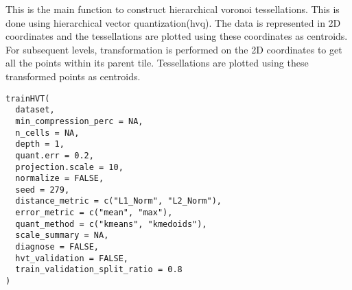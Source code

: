 \documentclass[letterpaper]{book}
\begin{document}
%
\begin{Description}
This is the main function to construct hierarchical voronoi tessellations.
This is done using hierarchical vector quantization(hvq). The data is represented in 2D
coordinates and the tessellations are plotted using these coordinates as
centroids. For subsequent levels, transformation is performed on the 2D
coordinates to get all the points within its parent tile. Tessellations are
plotted using these transformed points as centroids.
\end{Description}
%
\begin{Usage}
\begin{verbatim}
trainHVT(
  dataset,
  min_compression_perc = NA,
  n_cells = NA,
  depth = 1,
  quant.err = 0.2,
  projection.scale = 10,
  normalize = FALSE,
  seed = 279,
  distance_metric = c("L1_Norm", "L2_Norm"),
  error_metric = c("mean", "max"),
  quant_method = c("kmeans", "kmedoids"),
  scale_summary = NA,
  diagnose = FALSE,
  hvt_validation = FALSE,
  train_validation_split_ratio = 0.8
)
\end{verbatim}
\end{Usage}
%
\end{document}
